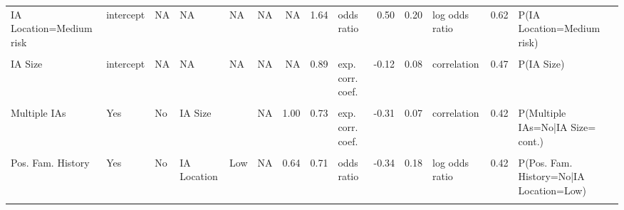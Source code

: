 \begin{landscape}
\begin{table}[!h]
{\begin{tabular}[t]{llllllrrlrrlrl}
\addlinespace
IA Location=Medium risk & intercept & NA & NA & NA & NA & NA & 1.64 & odds ratio & 0.50 & 0.20 & log odds ratio & 0.62 & P(IA Location=Medium risk)\\
\cellcolor{gray!6}{IA Size} & \cellcolor{gray!6}{} & \cellcolor{gray!6}{NA} & \cellcolor{gray!6}{Ruptured IA} & \cellcolor{gray!6}{Yes} & \cellcolor{gray!6}{No} & \cellcolor{gray!6}{1.00} & \cellcolor{gray!6}{0.66} & \cellcolor{gray!6}{odds ratio} & \cellcolor{gray!6}{-0.42} & \cellcolor{gray!6}{0.09} & \cellcolor{gray!6}{log odds ratio} & \cellcolor{gray!6}{0.40} & \cellcolor{gray!6}{P(IA Size= cont. |Ruptured IA=No)}\\
IA Size & intercept & NA & NA & NA & NA & NA & 0.89 & exp. corr. coef. & -0.12 & 0.08 & correlation & 0.47 & P(IA Size)\\
\addlinespace
\cellcolor{gray!6}{Multiple IAs} & \cellcolor{gray!6}{intercept} & \cellcolor{gray!6}{NA} & \cellcolor{gray!6}{NA} & \cellcolor{gray!6}{NA} & \cellcolor{gray!6}{NA} & \cellcolor{gray!6}{NA} & \cellcolor{gray!6}{1.57} & \cellcolor{gray!6}{odds ratio} & \cellcolor{gray!6}{0.45} & \cellcolor{gray!6}{0.12} & \cellcolor{gray!6}{log odds ratio} & \cellcolor{gray!6}{0.61} & \cellcolor{gray!6}{P(Multiple IAs=No)}\\
\addlinespace
Multiple IAs & Yes & No & IA Size &  & NA & 1.00 & 0.73 & exp. corr. coef. & -0.31 & 0.07 & correlation & 0.42 & P(Multiple IAs=No|IA Size= cont.)\\
\cellcolor{gray!6}{Pos. Fam. History} & \cellcolor{gray!6}{intercept} & \cellcolor{gray!6}{NA} & \cellcolor{gray!6}{NA} & \cellcolor{gray!6}{NA} & \cellcolor{gray!6}{NA} & \cellcolor{gray!6}{NA} & \cellcolor{gray!6}{2.69} & \cellcolor{gray!6}{odds ratio} & \cellcolor{gray!6}{0.99} & \cellcolor{gray!6}{0.08} & \cellcolor{gray!6}{log odds ratio} & \cellcolor{gray!6}{0.73} & \cellcolor{gray!6}{P(Pos. Fam. History=No)}\\
Pos. Fam. History & Yes & No & IA Location & Low & NA & 0.64 & 0.71 & odds ratio & -0.34 & 0.18 & log odds ratio & 0.42 & P(Pos. Fam. History=No|IA Location=Low)\\
\cellcolor{gray!6}{Pos. Fam. History} & \cellcolor{gray!6}{Yes} & \cellcolor{gray!6}{No} & \cellcolor{gray!6}{IA Location} & \cellcolor{gray!6}{Medium} & \cellcolor{gray!6}{NA} & \cellcolor{gray!6}{0.64} & \cellcolor{gray!6}{2.58} & \cellcolor{gray!6}{odds ratio} & \cellcolor{gray!6}{0.95} & \cellcolor{gray!6}{0.22} & \cellcolor{gray!6}{log odds ratio} & \cellcolor{gray!6}{0.72} & \cellcolor{gray!6}{P(Pos. Fam. History=No|IA Location=Medium)}\\

\end{tabular}}
\end{table}
\end{landscape}
